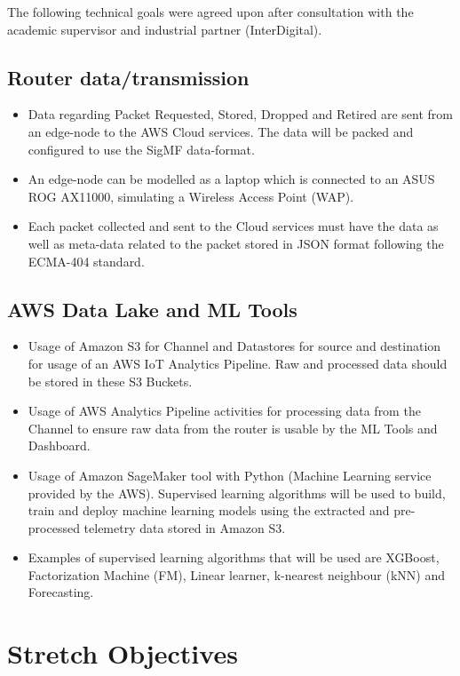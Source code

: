 The following technical goals were agreed upon after consultation with the academic
supervisor and industrial partner (InterDigital).

\subsection{Router data/transmission}

\begin{itemize}
  \item Data regarding Packet Requested, Stored, Dropped and Retired are sent from an edge-node to the AWS Cloud services. The data will be packed and configured to use the SigMF data-format.
  \item An edge-node can be modelled as a laptop which is connected to an ASUS ROG AX11000, simulating a Wireless Access Point (WAP).
  \item Each packet collected and sent to the Cloud services must have the data as well as meta-data related to the packet stored in JSON format following the ECMA-404 standard.
\end{itemize}

\subsection{AWS Data Lake and ML Tools}

\begin{itemize}
  \item Usage of Amazon S3 for Channel and Datastores for source and destination for usage of an AWS IoT
Analytics Pipeline. Raw and processed data should be stored in these S3 Buckets.
  \item Usage of AWS Analytics Pipeline activities for processing data from the Channel to ensure raw data from the router is usable by the ML Tools and Dashboard.
  \item Usage of Amazon SageMaker tool with Python (Machine Learning service provided by the AWS).
Supervised learning algorithms will be used to build, train and deploy machine learning models using the extracted and pre-processed telemetry data stored in Amazon S3.
  \item Examples of supervised learning algorithms that will be used are XGBoost, Factorization Machine (FM), Linear learner, k-nearest neighbour (kNN) and Forecasting.
\end{itemize}

\section{Stretch Objectives}

